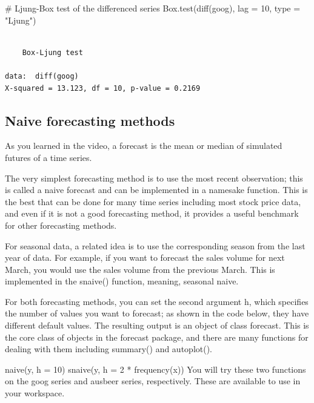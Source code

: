 \documentclass[
  letterpaper,
  DIV=11,
  numbers=noendperiod]{scrartcl}
\newenvironment{Shaded}{\begin{snugshade}}{\end{snugshade}}
\newcommand{\AttributeTok}[1]{\textcolor[rgb]{0.40,0.45,0.13}{#1}}
\newcommand{\CommentTok}[1]{\textcolor[rgb]{0.37,0.37,0.37}{#1}}
\newcommand{\DecValTok}[1]{\textcolor[rgb]{0.68,0.00,0.00}{#1}}
\newcommand{\FunctionTok}[1]{\textcolor[rgb]{0.28,0.35,0.67}{#1}}
\newcommand{\NormalTok}[1]{\textcolor[rgb]{0.00,0.23,0.31}{#1}}
\newcommand{\StringTok}[1]{\textcolor[rgb]{0.13,0.47,0.30}{#1}}
\begin{document}
\begin{Shaded}
\begin{Highlighting}[]
\CommentTok{\# Ljung{-}Box test of the differenced series}
\FunctionTok{Box.test}\NormalTok{(}\FunctionTok{diff}\NormalTok{(goog), }\AttributeTok{lag =} \DecValTok{10}\NormalTok{, }\AttributeTok{type =} \StringTok{"Ljung"}\NormalTok{)}
\end{Highlighting}
\end{Shaded}

\begin{verbatim}

    Box-Ljung test

data:  diff(goog)
X-squared = 13.123, df = 10, p-value = 0.2169
\end{verbatim}

\hypertarget{naive-forecasting-methods}{%
\subsection{Naive forecasting methods}\label{naive-forecasting-methods}}

As you learned in the video, a forecast is the mean or median of
simulated futures of a time series.

The very simplest forecasting method is to use the most recent
observation; this is called a naive forecast and can be implemented in a
namesake function. This is the best that can be done for many time
series including most stock price data, and even if it is not a good
forecasting method, it provides a useful benchmark for other forecasting
methods.

For seasonal data, a related idea is to use the corresponding season
from the last year of data. For example, if you want to forecast the
sales volume for next March, you would use the sales volume from the
previous March. This is implemented in the snaive() function, meaning,
seasonal naive.

For both forecasting methods, you can set the second argument h, which
specifies the number of values you want to forecast; as shown in the
code below, they have different default values. The resulting output is
an object of class forecast. This is the core class of objects in the
forecast package, and there are many functions for dealing with them
including summary() and autoplot().

naive(y, h = 10) snaive(y, h = 2 * frequency(x)) You will try these two
functions on the goog series and ausbeer series, respectively. These are
available to use in your workspace.
\end{document}
